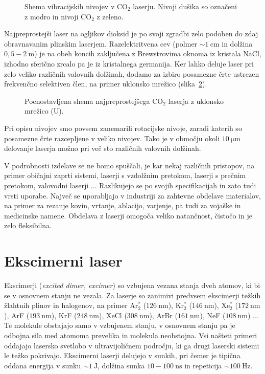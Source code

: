 \begin{figure}[h]
\centering
\def\svgwidth{100truemm} 

\caption{Shema vibracijskih nivojev v CO$_2$ laserju. Nivoji dušika so označeni
z modro in nivoji CO$_2$ z zeleno.}
\label{fig:CO2E}
\end{figure}

Najpreprostejši laser na ogljikov dioksid je po svoji zgradbi zelo podoben do zdaj
obravnavanim plinskim laserjem. Razelektritvena cev (polmer $\sim 1~\si{\centi\metre}$
in dolžina $0,5-2~\si{\metre}$) je na obeh koncih zaključena z Brewstrovima oknoma
iz kristala NaCl, izhodno sferično zrcalo pa je iz kristalnega germanija. Ker lahko deluje
laser pri zelo veliko različnih valovnih dolžinah, dodamo za izbiro posamezne črte ustrezen
frekvenčno selektiven člen, na primer uklonsko mrežico (slika~\ref{fig:CO2S}).

\begin{figure}[h]
\centering
\def\svgwidth{90truemm} 

\caption{Poenostavljena shema najpreprostejšega CO$_2$ laserja z uklonsko mrežico (U).
}
\label{fig:CO2S}
\end{figure}

\begin{remark}
 Pri opisu nivojev smo povsem zanemarili rotacijske nivoje, zaradi katerih so 
 posamezne črte razcepljene v veliko nivojev. Tako je v območju okoli $10~\si{\micro\meter}$
 delovanje laserja možno pri več sto različnih valovnih dolžinah.
\end{remark}

V podrobnosti izdelave se ne bomo spuščali, je kar nekaj različnih pristopov, 
na primer običajni zaprti sistemi, laserji s vzdolžnim pretokom, laserji s prečnim pretokom,
valovodni laserji ... Razlikujejo se po svojih specifikacijah in zato tudi vrsti uporabe.
Največ se uporabljajo v industriji za zahtevne obdelave materialov, na primer za rezanje 
kovin, vrtanje, ablacijo, varjenje, pa tudi za vojaške in medicinske namene.
Obdelava z laserji omogoča veliko natančnost, čistočo in je zelo fleksibilna.

\section{Ekscimerni laser}

Ekscimerji ({\it excited dimer, excimer}) so vzbujena vezana stanja dveh atomov, 
ki bi se v osnovnem stanju ne vezala. Za laserje so zanimivi predvsem ekscimerji
težkih žlahtnih plinov in halogenov, na primer Ar$_2^*$ ($126~\si{\nano\metre}$), 
Kr$_2^*$ ($146~\si{\nano\metre}$), Xe$_2^*$ ($172~\si{\nano\metre}$),
ArF ($193~\si{\nano\metre}$), KrF ($248~\si{\nano\metre}$), 
XeCl ($308~\si{\nano\metre}$), ArBr ($161~\si{\nano\metre}$), 
NeF ($108~\si{\nano\metre}$) ... Te molekule obstajajo samo v vzbujenem stanju,
v osnovnem stanju pa je odbojna sila med atomoma prevelika in molekula neobstojna.
Vsi našteti primeri oddajajo lasersko svetlobo v
ultravijoličnem področju, ki ga drugi laserski sistemi le težko pokrivajo. 
Ekscimerni laserji delujejo v sunkih, pri čemer je tipična oddana energija v sunku 
$\sim 1~\si{\joule}$, dolžina sunka $10-100~\si{\nano\second}$ in repeticija 
$\sim 100~\si{\hertz}$.


